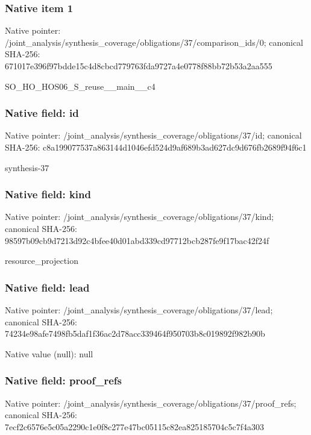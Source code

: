 \documentclass[10pt,a4paper]{article}
\begin{document}
\subsubsection{Native item 1}
Native pointer: /joint\_\allowbreak{}analysis/synthesis\_\allowbreak{}coverage/obligations/37/comparison\_\allowbreak{}ids/0; canonical SHA-256: 671017e396f97bdde15c4d8cbcd779763fda9727a4e0778f88bb72b53a2aa555

\begingroup\raggedright\sloppy SO\_\allowbreak{}HO\_\allowbreak{}HOS06\_\allowbreak{}S\_\allowbreak{}reuse\_\allowbreak{}\_\allowbreak{}main\_\allowbreak{}\_\allowbreak{}c4\par\endgroup

\subsubsection{Native field: id}
Native pointer: /joint\_\allowbreak{}analysis/synthesis\_\allowbreak{}coverage/obligations/37/id; canonical SHA-256: c8a199077537a863144d1046efd524d9af689b3ad627dc9d676fb2689f94f6c1

\begingroup\raggedright\sloppy synthesis-37\par\endgroup

\subsubsection{Native field: kind}
Native pointer: /joint\_\allowbreak{}analysis/synthesis\_\allowbreak{}coverage/obligations/37/kind; canonical SHA-256: 98597b09cb9d7213d92c4bfee40d01abd339cd97712bcb287fe9f17bac42f24f

\begingroup\raggedright\sloppy resource\_\allowbreak{}projection\par\endgroup

\subsubsection{Native field: lead}
Native pointer: /joint\_\allowbreak{}analysis/synthesis\_\allowbreak{}coverage/obligations/37/lead; canonical SHA-256: 74234e98afe7498fb5daf1f36ac2d78acc339464f950703b8c019892f982b90b

Native value (null): null

\subsubsection{Native field: proof\_\allowbreak{}refs}
Native pointer: /joint\_\allowbreak{}analysis/synthesis\_\allowbreak{}coverage/obligations/37/proof\_\allowbreak{}refs; canonical SHA-256: 7ecf2c6576e5c05a2290c1e0f8c277e47bc05115c82ea825185704c5c7f4a303
\end{document}
